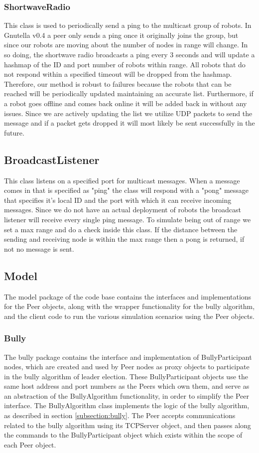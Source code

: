 \documentclass[10pt,letterpaper]{article}
\begin{document}
    \subsubsection{ShortwaveRadio}
    This class is used to periodically send a ping to the multicast group of robots. In Gnutella v0.4 a peer only sends a ping once it originally joins the group, but since our robots are moving about the number of nodes in range will change. In so doing, the shortwave radio broadcasts a ping every 3 seconds and will update a hashmap of the ID and port number of robots within range. All robots that do not respond within a specified timeout will be dropped from the hashmap. Therefore, our method is robust to failures because the robots that can be reached will be periodically updated maintaining an accurate list. Furthermore, if a robot goes offline and comes back online it will be added back in without any issues. Since we are actively updating the list we utilize UDP packets to send the message and if a packet gets dropped it will most likely be sent successfully in the future.
    \subsection{BroadcastListener}
    This class listens on a specified port for multicast messages. When a message comes in that is specified as "ping" the class will respond with a "pong" message that specifies it's local ID and the port with which it can receive incoming messages. Since we do not have an actual deployment of robots the broadcast listener will receive every single ping message. To simulate being out of range we set a max range and do a check inside this class. If the distance between the sending and receiving node is within the max range then a pong is returned, if not no message is sent.
\subsection{Model}
    The model package of the code base contains the interfaces and implementations for the Peer objects, along with the wrapper functionality for the bully algorithm, and the client code to run the various simulation scenarios using the Peer objects.
    \subsubsection{Bully} 
    The bully package contains the interface and implementation of BullyParticipant nodes, which are created and used by Peer nodes as proxy objects to participate in the bully algorithm of leader election. These BullyParticipant objects use the same host address and port numbers as the Peers which own them, and serve as an abstraction of the BullyAlgorithm functionality, in order to simplify the Peer interface. The BullyAlgorithm class implements the logic of the bully algorithm, as described in section \ref{subsection:bully}. The Peer accepts communications related to the bully algorithm using its TCPServer object, and then passes along the commands to the BullyParticipant object which exists within the scope of each Peer object. 
\end{document}
